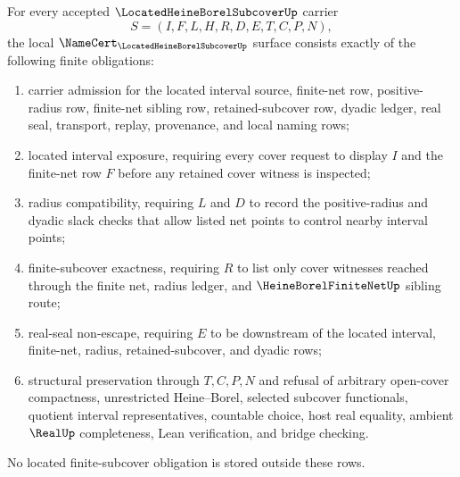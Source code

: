 \begin{theorem}
\label{thm:located-heine-borel-subcover-namecert-obligations}
For every accepted $\LocatedHeineBorelSubcoverUp$ carrier
$$
S=(I,F,L,H,R,D,E,T,C,P,N),
$$
the local $\NameCert_{\LocatedHeineBorelSubcoverUp}$ surface consists exactly of the following finite obligations:
\begin{enumerate}
\item carrier admission for the located interval source, finite-net row, positive-radius row, finite-net sibling row, retained-subcover row, dyadic ledger, real seal, transport, replay, provenance, and local naming rows;
\item located interval exposure, requiring every cover request to display $I$ and the finite-net row $F$ before any retained cover witness is inspected;
\item radius compatibility, requiring $L$ and $D$ to record the positive-radius and dyadic slack checks that allow listed net points to control nearby interval points;
\item finite-subcover exactness, requiring $R$ to list only cover witnesses reached through the finite net, radius ledger, and $\HeineBorelFiniteNetUp$ sibling route;
\item real-seal non-escape, requiring $E$ to be downstream of the located interval, finite-net, radius, retained-subcover, and dyadic rows;
\item structural preservation through $T,C,P,N$ and refusal of arbitrary open-cover compactness, unrestricted Heine--Borel, selected subcover functionals, quotient interval representatives, countable choice, host real equality, ambient $\RealUp$ completeness, Lean verification, and bridge checking.
\end{enumerate}
No located finite-subcover obligation is stored outside these rows.
\end{theorem}
